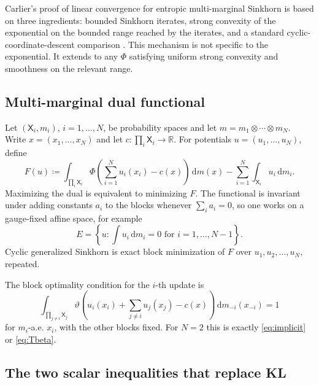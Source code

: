 \documentclass[11pt]{article}
\newcommand{\R}{\mathbb{R}}
\newcommand{\X}{\mathsf{X}}
\newcommand{\dd}{\,\mathrm{d}}
\newcommand{\defeq}{\coloneqq}
\begin{document}
Carlier's proof of linear convergence for entropic multi-marginal Sinkhorn is
based on three ingredients: bounded Sinkhorn iterates, strong convexity of the
exponential on the bounded range reached by the iterates, and a standard
cyclic-coordinate-descent comparison \cite{carlier2022}.  This mechanism is not
specific to the exponential.  It extends to any $\Phi$ satisfying uniform
strong convexity and smoothness on the relevant range.

\subsection{Multi-marginal dual functional}

Let $(\X_i,m_i)$, $i=1,\ldots,N$, be probability spaces and let
$m=m_1\otimes\cdots\otimes m_N$.  Write
$x=(x_1,\ldots,x_N)$ and let $c:\prod_i\X_i\to\R$.  For potentials
$u=(u_1,\ldots,u_N)$, define
\begin{equation}\label{eq:multiF}
  F(u)
  \defeq
  \int_{\prod_i\X_i}
  \Phi\left(\sum_{i=1}^N u_i(x_i)-c(x)\right)
  \dd m(x)
  -
  \sum_{i=1}^N\int_{\X_i} u_i\dd m_i.
\end{equation}
Maximizing the dual is equivalent to minimizing $F$.  The functional is
invariant under adding constants $a_i$ to the blocks whenever
$\sum_i a_i=0$, so one works on a gauge-fixed affine space, for example
\begin{equation*}
  E=\left\{u:\int u_i\dd m_i=0\text{ for }i=1,
  \ldots,N-1\right\}.
\end{equation*}
Cyclic generalized Sinkhorn is exact block minimization of $F$ over
$u_1,u_2,\ldots,u_N$, repeated.

The block optimality condition for the $i$-th update is
\begin{equation}\label{eq:blockcondition}
  \int_{\prod_{j\ne i}\X_j}
  \vartheta\left(
  u_i(x_i)+\sum_{j\ne i}u_j(x_j)-c(x)
  \right)
  \dd m_{-i}(x_{-i})=1
\end{equation}
for $m_i$-a.e. $x_i$, with the other blocks fixed.  For $N=2$ this is exactly
\eqref{eq:implicit} or \eqref{eq:Tbeta}.

\subsection{The two scalar inequalities that replace KL}
\end{document}
